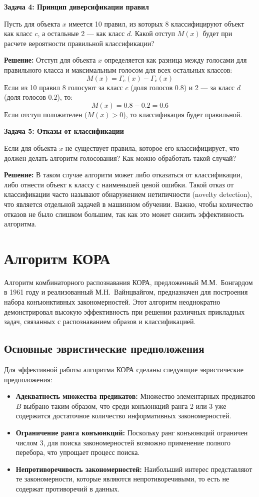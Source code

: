 \textbf{Задача 4: Принцип диверсификации правил}

Пусть для объекта $x$ имеется 10 правил, из которых 8 классифицируют объект как класс $c$, а остальные 2 — как класс $d$. Какой отступ $M(x)$ будет при расчете вероятности правильной классификации?

\textbf{Решение:}  
Отступ для объекта $x$ определяется как разница между голосами для правильного класса и максимальным голосом для всех остальных классов:
\[
M(x) = \Gamma_c(x) - \Gamma_{\overline{c}}(x)
\]
Если из 10 правил 8 голосуют за класс $c$ (доля голосов $0.8$) и 2 — за класс $d$ (доля голосов $0.2$), то:
\[
M(x) = 0.8 - 0.2 = 0.6
\]
Если отступ положителен ($M(x) > 0$), то классификация будет правильной.

\textbf{Задача 5: Отказы от классификации}

Если для объекта $x$ не существует правила, которое его классифицирует, что должен делать алгоритм голосования? Как можно обработать такой случай?

\textbf{Решение:}  
В таком случае алгоритм может либо отказаться от классификации, либо отнести объект к классу с наименьшей ценой ошибки. Такой отказ от классификации часто называют обнаружением нетипичности (novelty detection), что является отдельной задачей в машинном обучении. Важно, чтобы количество отказов не было слишком большим, так как это может снизить эффективность алгоритма.

\section{Алгоритм КОРА}

Алгоритм комбинаторного распознавания КОРА, предложенный М.М.~Бонгардом в 1961 году и реализованный М.Н.~Вайнцвайгом, предназначен для построения набора конъюнктивных закономерностей. Этот алгоритм неоднократно демонстрировал высокую эффективность при решении различных прикладных задач, связанных с распознаванием образов и классификацией.

\subsection{Основные эвристические предположения}

Для эффективной работы алгоритма КОРА сделаны следующие эвристические предположения:

\begin{itemize}
    \item \textbf{Адекватность множества предикатов:} Множество элементарных предикатов \(B\) выбрано таким образом, что среди конъюнкций ранга 2 или 3 уже содержится достаточное количество информативных закономерностей.
    \item \textbf{Ограничение ранга конъюнкций:} Поскольку ранг конъюнкций ограничен числом 3, для поиска закономерностей возможно применение полного перебора, что упрощает процесс поиска.
    \item \textbf{Непротиворечивость закономерностей:} Наибольший интерес представляют те закономерности, которые являются непротиворечивыми, то есть не содержат противоречий в данных.
\end{itemize}

